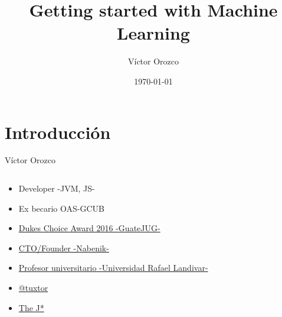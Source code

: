\documentclass{beamer}
\title{Getting started with Machine Learning}
\author{Víctor Orozco}
\institute{Nabenik}
\date{\today}
\begin{document}
\frame{\titlepage}

\section{Introducción}


\begin{frame}{Víctor Orozco}
    \begin{columns}[T] %
        \begin{column}[T]{5cm} %
            \begin{itemize}
                \item Developer -JVM, JS- 
                \item Ex becario OAS-GCUB
                \item \href{https://www.oracle.com/javaone/dukes-choice-award.html}{Dukes Choice Award 2016 -GuateJUG-}
                \item \href{http://www.nabenik.com}{CTO/Founder -Nabenik-}
                \item \href{http://www.url.edu.gt/}{Profesor universitario -Universidad Rafael Landivar-}
                \item \href{https://twitter.com/tuxtor}{@tuxtor}
                \item \href{http://vorozco.com}{The J*} 
            \end{itemize}
        \end{column}
        \begin{column}[T]{3cm} %
            \begin{figure}
                \centering

\end{figure}
\end{column}
\end{columns}
\end{frame}
\end{document}
